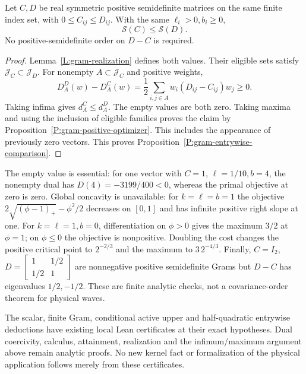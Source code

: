 \begin{proposition}\label{P:gram-entrywise-comparison}
  Let $C,D$ be real symmetric positive semidefinite matrices on the same finite
  index set, with $0 \le C_{ij} \le D_{ij}$. With the same $\ell_i > 0,b_i \ge
  0$,
  \[
    \mathscr{S}(C)\le\mathscr{S}(D).
  \]
  No positive-semidefinite order on $D-C$ is required.
\end{proposition}

\begin{proof}
  Lemma~\ref{L:gram-realization} defines both values. Their eligible sets
  satisfy $\mathcal{J}_C \subset \mathcal{J}_D$. For nonempty $A \subset
  \mathcal{J}_C$ and positive weights,
  \[
    D_A^D(w)-D_A^C(w)
    =\frac12\sum_{i,j\in A}w_i(D_{ij}-C_{ij})w_j\ge0.
  \]
  Taking infima gives $d_A^C \le d_A^D$. The empty values are both zero. Taking
  maxima and using the inclusion of eligible families proves the claim by
  Proposition~\ref{P:gram-positive-optimizer}. This includes the appearance of
  previously zero vectors. This proves
  Proposition~\ref{P:gram-entrywise-comparison}.
\end{proof}

\begin{remark}\label{R:gram-controls}
  The empty value is essential: for one vector with $C = 1$, $\ell = 1/10,b =
  4$, the nonempty dual has $D(4) = -3199/400 < 0$, whereas the primal objective
  at zero is zero. Global concavity is unavailable: for $k = \ell = b = 1$ the
  objective $2\sqrt{(\phi-1)_+}-\phi^2/2$ decreases on $[0,1]$ and has infinite
  positive right slope at one. For $k = \ell = 1,b = 0$, differentiation on
  $\phi > 0$ gives the maximum $3/2$ at $\phi = 1$; on $\phi \le 0$ the
  objective is nonpositive. Doubling the cost changes the positive critical
  point to $2^{-2/3}$ and the maximum to $3\,2^{-4/3}$. Finally, $C = I_2$, $D =
  \left[\begin{smallmatrix}1&1/2\\1/2&1\end{smallmatrix}\right]$ are nonnegative
  positive semidefinite Grams but $D-C$ has eigenvalues $1/2,-1/2$. These are
  finite analytic checks, not a covariance-order theorem for physical waves.

  The scalar, finite Gram, conditional active upper and half-quadratic entrywise
  deductions have existing local Lean certificates at their exact hypotheses.
  Dual coercivity, calculus, attainment, realization and the infimum/maximum
  argument above remain analytic proofs. No new kernel fact or formalization of
  the physical application follows merely from these certificates.
\end{remark}
